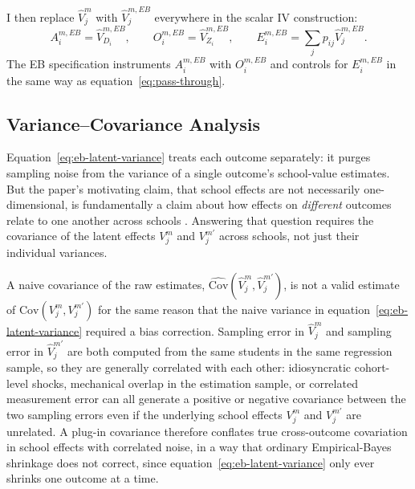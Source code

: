 \documentclass[a4paper, article, english, oneside, unknownkeysallowed, 12pt]{memoir}
\begin{document}
I then replace $\widehat{V}_j^m$ with $\widehat{V}_{j}^{m,EB}$ everywhere in the scalar IV construction:
\begin{equation}
  A_i^{m,EB} = \widehat{V}_{D_i}^{m,EB},
  \qquad
  O_i^{m,EB} = \widehat{V}_{Z_i}^{m,EB},
  \qquad
  E_i^{m,EB} = \sum_j p_{ij}\widehat{V}_{j}^{m,EB}.
  \label{eq:eb-iv-objects}
\end{equation}
The EB specification instruments $A_i^{m,EB}$ with $O_i^{m,EB}$ and controls for $E_i^{m,EB}$ in the same way as equation~\eqref{eq:pass-through}.


\subsection{Variance--Covariance Analysis}

Equation~\eqref{eq:eb-latent-variance} treats each outcome separately: it purges sampling noise from the variance of a single outcome's school-value estimates.
But the paper's motivating claim, that school effects are not necessarily one-dimensional, is fundamentally a claim about how effects on \emph{different} outcomes relate to one another across schools \parencite{jackson_what_2018, rose_effects_2022}.
Answering that question requires the covariance of the latent effects $V_j^m$ and $V_j^{m'}$ across schools, not just their individual variances.

A naive covariance of the raw estimates, $\widehat{\mathrm{Cov}}\left(\widehat V_j^m, \widehat V_j^{m'}\right)$, is not a valid estimate of $\mathrm{Cov}(V_j^m, V_j^{m'})$ for the same reason that the naive variance in equation~\eqref{eq:eb-latent-variance} required a bias correction.
Sampling error in $\widehat V_j^m$ and sampling error in $\widehat V_j^{m'}$ are both computed from the same students in the same regression sample, so they are generally correlated with each other: idiosyncratic cohort-level shocks, mechanical overlap in the estimation sample, or correlated measurement error can all generate a positive or negative covariance between the two sampling errors even if the underlying school effects $V_j^m$ and $V_j^{m'}$ are unrelated.
A plug-in covariance therefore conflates true cross-outcome covariation in school effects with correlated noise, in a way that ordinary Empirical-Bayes shrinkage does not correct, since equation~\eqref{eq:eb-latent-variance} only ever shrinks one outcome at a time.
\end{document}
